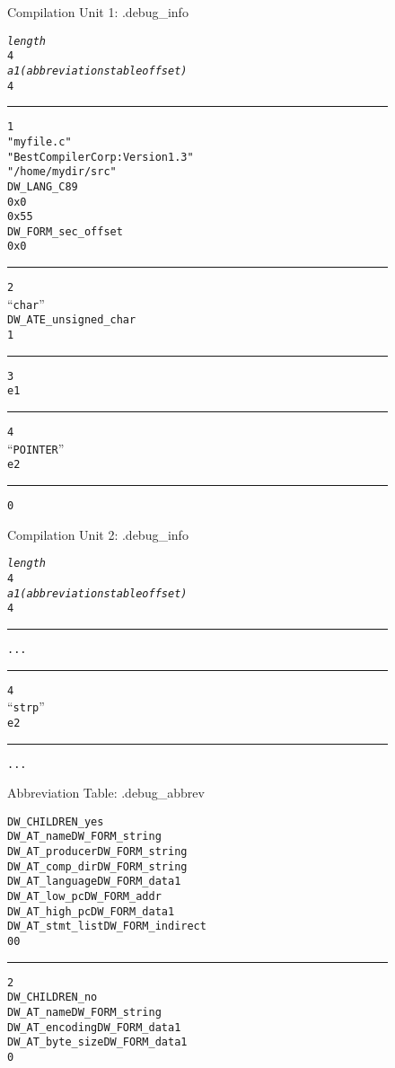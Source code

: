\clearpage
\begin{figure}[here]
\begin{minipage}{0.4\textwidth}
\centering
Compilation Unit 1: .debug\_info
\begin{framed}
\scriptsize
\begin{alltt}
\textit{length}
4
\textit{a1 (abbreviations table offset)}
4
\vspace{0.01cm}
\hrule
1
"myfile.c"
"Best Compiler Corp: Version 1.3"
"/home/mydir/src"
DW\-\_LANG\-\_C89
0x0
0x55
DW\-\_FORM\-\_sec\-\_offset
0x0
\vspace{0.01cm}
\hrule
2
“char”
DW\-\_ATE\-\_unsigned\-\_char
1
\vspace{0.01cm}
\hrule
3
e1
\vspace{0.01cm}
\hrule
4
“POINTER”
e2
\vspace{0.01cm}
\hrule
0
\end{alltt}
%
%
\end{framed}
Compilation Unit 2: .debug\_info
\begin{framed}
\scriptsize
\begin{alltt}
\textit{length}
4
\textit{a1 (abbreviations table offset)}
4
\vspace{0.01cm}
\hrule
...
\vspace{0.01cm}
\hrule
4
“strp”
e2
\vspace{0.01cm}
\hrule
...
\end{alltt}
%
%
\end{framed}
\end{minipage}
\hfill
\begin{minipage}{0.4\textwidth}
\centering
Abbreviation Table: .debug\_abbrev
\begin{framed}
\scriptsize
\begin{alltt}
DW\-\_CHILDREN\-\_yes
DW\-\_AT\-\_name       DW\-\_FORM\-\_string
DW\-\_AT\-\_producer   DW\-\_FORM\-\_string
DW\-\_AT\-\_comp\-\_dir   DW\-\_FORM\-\_string
DW\-\_AT\-\_language   DW\-\_FORM\-\_data1
DW\-\_AT\-\_low\-\_pc     DW\-\_FORM\-\_addr
DW\-\_AT\-\_high\-\_pc    DW\-\_FORM\-\_data1
DW\-\_AT\-\_stmt\-\_list  DW\-\_FORM\-\_indirect
0                  0
\vspace{0.01cm}
\hrule
2
DW\-\_CHILDREN\-\_no
DW\-\_AT\-\_name       DW\-\_FORM\-\_string
DW\-\_AT\-\_encoding   DW\-\_FORM\-\_data1
DW\-\_AT\-\_byte\-\_size  DW\-\_FORM\-\_data1
0
\vspace{0.01cm}

\end{alltt}
\end{framed}
\end{minipage}
\end{figure}
